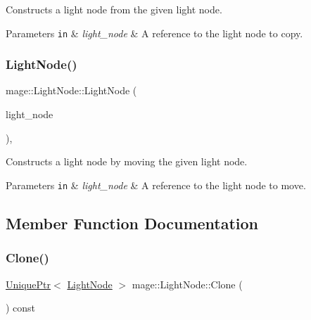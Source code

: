 Constructs a light node from the given light node.


\begin{DoxyParams}[1]{Parameters}
\mbox{\tt in}  & {\em light\+\_\+node} & A reference to the light node to copy. \\
\hline
\end{DoxyParams}
\hypertarget{classmage_1_1_light_node_a0a2d5ee9e6417d73905d6f35116eccb3}{}\label{classmage_1_1_light_node_a0a2d5ee9e6417d73905d6f35116eccb3} 
\subsubsection{\texorpdfstring{Light\+Node()}{LightNode()}\hspace{0.1cm}{\footnotesize\ttfamily [3/3]}}
{\footnotesize\ttfamily mage\+::\+Light\+Node\+::\+Light\+Node (\begin{DoxyParamCaption}\item[{\hyperlink{classmage_1_1_light_node}{Light\+Node} \&\&}]{light\+\_\+node }\end{DoxyParamCaption})\hspace{0.3cm}{\ttfamily [protected]}, {\ttfamily [default]}}

Constructs a light node by moving the given light node.


\begin{DoxyParams}[1]{Parameters}
\mbox{\tt in}  & {\em light\+\_\+node} & A reference to the light node to move. \\
\hline
\end{DoxyParams}


\subsection{Member Function Documentation}
\hypertarget{classmage_1_1_light_node_a4d0c10f03de71cd497635feb431d02d5}{}\label{classmage_1_1_light_node_a4d0c10f03de71cd497635feb431d02d5} 
\subsubsection{\texorpdfstring{Clone()}{Clone()}}
{\footnotesize\ttfamily \hyperlink{namespacemage_a8c307fbcc33bce9b7f2aa4c26c3b95cf}{Unique\+Ptr}$<$ \hyperlink{classmage_1_1_light_node}{Light\+Node} $>$ mage\+::\+Light\+Node\+::\+Clone (\begin{DoxyParamCaption}{ }\end{DoxyParamCaption}) const}

